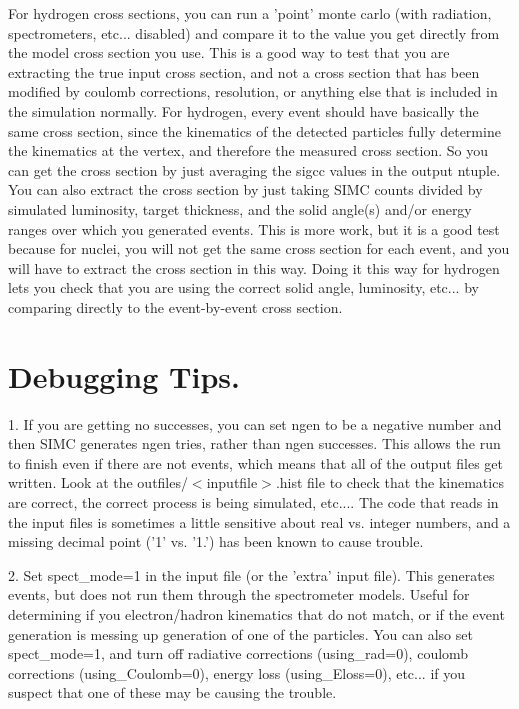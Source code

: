	For hydrogen cross sections, you can run a 'point' monte carlo (with 
radiation, spectrometers, etc... disabled) and compare it to the value you get
directly from the model cross section you use.  This is a good way to test
that you are extracting the true input cross section, and not a cross section
that has been modified by coulomb corrections, resolution, or anything else
that is included in the simulation normally.  For hydrogen, every event should
have basically the same cross section, since the kinematics of the detected
particles fully determine the kinematics at the vertex, and therefore the
measured cross section.  So you can get the cross section by just averaging
the sigcc values in the output ntuple.  You can also extract the cross section
by just taking SIMC counts divided by simulated luminosity, target thickness,
and the solid angle(s) and/or energy ranges over which you generated events.
This is more work, but it is a good test because for nuclei, you will not 
get the same cross section for each event, and you will have to extract the
cross section in this way.  Doing it this way for hydrogen lets you check that
you are using the correct solid angle, luminosity, etc... by comparing directly
to the event-by-event cross section.

\section{Debugging Tips.}

1. If you are getting no successes, you can set ngen to be a negative number
and then SIMC generates ngen tries, rather than ngen successes.  This allows
the run to finish even if there are not events, which means that all of the
output files get written.  Look at the outfiles/$<$inputfile$>$.hist file
to check that the kinematics are correct, the correct process is being
simulated, etc....  The code that reads in the input files is sometimes a
little sensitive about real vs. integer numbers, and a missing decimal point
('1' vs. '1.') has been known to cause trouble.

2. Set spect\_mode=1 in the input file (or the 'extra' input file).  This
generates events, but does not run them through the spectrometer models.
Useful for determining if you electron/hadron kinematics that do not match,
or if the event generation is messing up generation of one of the particles.
You can also set spect\_mode=1, and turn off radiative corrections (using\_rad=0), 
coulomb corrections (using\_Coulomb=0), energy loss (using\_Eloss=0), etc...
if you suspect that one of these may be causing the trouble.

